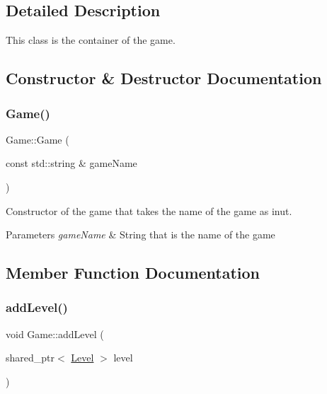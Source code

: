 \subsection{Detailed Description}
This class is the container of the game. 

\subsection{Constructor \& Destructor Documentation}
\mbox{\label{classGame_a390a5384cd8ed6839148d036499b2d95}} 
\subsubsection{\texorpdfstring{Game()}{Game()}}
{\footnotesize\ttfamily Game\+::\+Game (\begin{DoxyParamCaption}\item[{const std\+::string \&}]{game\+Name }\end{DoxyParamCaption})\hspace{0.3cm}{\ttfamily [explicit]}}



Constructor of the game that takes the name of the game as inut. 


\begin{DoxyParams}{Parameters}
{\em game\+Name} & String that is the name of the game \\
\hline
\end{DoxyParams}


\subsection{Member Function Documentation}
\mbox{\label{classGame_aa85c4d8154aff77cd064b859ea6c1da2}} 
\subsubsection{\texorpdfstring{add\+Level()}{addLevel()}}
{\footnotesize\ttfamily void Game\+::add\+Level (\begin{DoxyParamCaption}\item[{shared\+\_\+ptr$<$ \hyperlink{classLevel}{Level} $>$}]{level }\end{DoxyParamCaption})}



